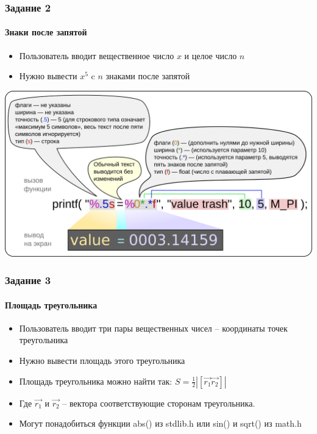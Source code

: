 \documentclass[14pt,pdf,hyperref={unicode}]{beamer}
\begin{document}
\begin{frame}
\frametitle{Задание 2} 
\framesubtitle{Знаки после запятой} 
\begin{center}
\begin{itemize}
\item Пользователь вводит вещественное число $x$ и целое число $n$ \\
\item Нужно вывести $x^5$ c $n$ знаками после запятой\\
\end{itemize}
\end{center}
\begin{center}
\includegraphics[scale=0.5]{Printf_illustration.png}
\end{center}
\end{frame}

\begin{frame}
\frametitle{Задание 3} 
\framesubtitle{Площадь треугольника} 
\begin{center}
\begin{itemize}
\item Пользователь вводит три пары вещественных чисел -- координаты точек треугольника\\
\item Нужно вывести площадь этого треугольника\\
\item Площадь треугольника можно найти так: $S = \frac{1}{2}|[\vec{r_1} \vec{r_2}]|$\\
\item Где $\vec{r_1}$ и $\vec{r_2}$ -- вектора соответствующие сторонам треугольника.
\item Могут понадобиться функции abs() из stdlib.h или sin() и sqrt() из math.h
\end{itemize}
\end{center}
\end{frame}
\end{document}
